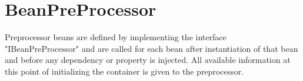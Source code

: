 \section{BeanPreProcessor}
\label{feature:BeanPreProcessor}
\ClearAPI
Preprocessor beans are defined by implementing the interface "IBeanPreProcessor" and are called for each bean after instantiation of that bean and before any dependency or property is injected. All available information at this point of initializing the container is given to the preprocessor.

